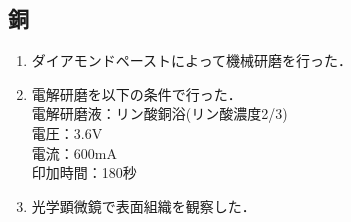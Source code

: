 \subsection{銅}
\begin{enumerate}
    \item ダイアモンドペーストによって機械研磨を行った．
    \item 電解研磨を以下の条件で行った．\\
          電解研磨液：リン酸銅浴(リン酸濃度2/3)\\
          電圧：3.6V\\
          電流：600mA\\
          印加時間：180秒
    \item 光学顕微鏡で表面組織を観察した．
\end{enumerate}
\clearpage